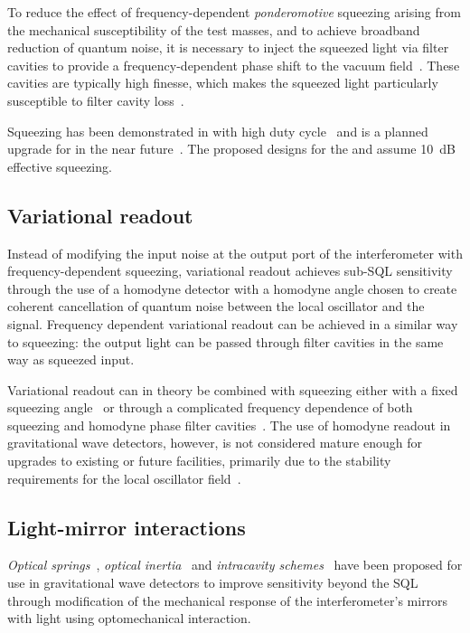 To reduce the effect of frequency-dependent \emph{ponderomotive} squeezing arising from the mechanical susceptibility of the test masses, and to achieve broadband reduction of quantum noise, it is necessary to inject the squeezed light via filter cavities to provide a frequency-dependent phase shift to the vacuum field~\cite{Kimble2001}. These cavities are typically high finesse, which makes the squeezed light particularly susceptible to filter cavity loss~\cite{Kwee2014}.

Squeezing has been demonstrated in \GEO{} with high duty cycle~\cite{Grote2013} and is a planned upgrade for \ALIGO{} in the near future~\cite{Miller2015}. The proposed designs for the \ET{} and \LIGOCE{} assume \SI{10}{\deci\bel} effective squeezing.

\subsection{Variational readout}
Instead of modifying the input noise at the output port of the interferometer with frequency-dependent squeezing, variational readout achieves sub-\gls{SQL} sensitivity through the use of a homodyne detector with a homodyne angle chosen to create coherent cancellation of quantum noise between the local oscillator and the signal. Frequency dependent variational readout can be achieved in a similar way to squeezing: the output light can be passed through filter cavities in the same way as squeezed input.

Variational readout can in theory be combined with squeezing either with a fixed squeezing angle~\cite{Buonanno2004} or through a complicated frequency dependence of both squeezing and homodyne phase filter cavities~\cite{Harms2003}. The use of homodyne readout in gravitational wave detectors, however, is not considered mature enough for upgrades to existing or future facilities, primarily due to the stability requirements for the local oscillator field~\cite{Steinlechner2015}.

\subsection{Light-mirror interactions}
\emph{Optical springs}~\cite{Braginsky1999, Buonanno2002, Corbitt2007, Rehbein2008, Gordon2015}, \emph{optical inertia}~\cite{Khalili2011, Voronchev2012} and \emph{intracavity schemes}~\cite{Braginsky1997, Khalili2002, Danilishin2006} have been proposed for use in gravitational wave detectors to improve sensitivity beyond the \gls{SQL} through modification of the mechanical response of the interferometer's mirrors with light using optomechanical interaction.

